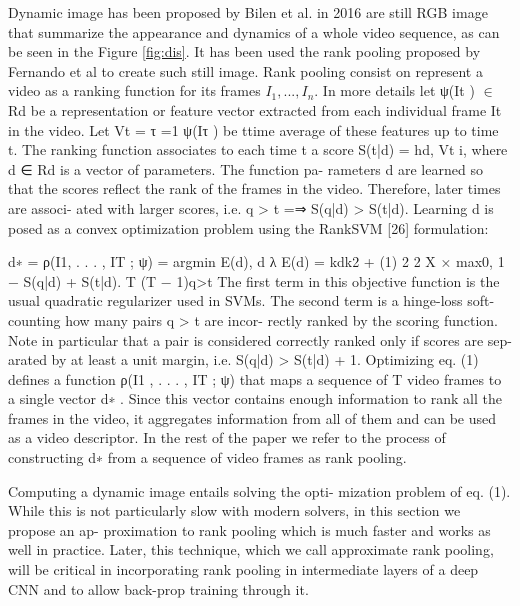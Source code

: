 \documentclass[10pt,twocolumn,letterpaper]{article}
\begin{document}
Dynamic image has been proposed by Bilen et al. in 2016 \cite{bilen2016dynamic} are still RGB image that summarize the appearance and dynamics of a whole video sequence, as can be seen in the Figure \ref{fig:dis}. It has been used the rank pooling proposed by Fernando et al \cite{FernandoGMGT15} to create such still image. Rank pooling consist on represent a video as a ranking function for its frames $I_1, ..., I_n$. In more details let ψ(It ) $\in$ Rd be a representation or feature vector extracted from each individual frame It in the video. Let Vt = τ =1 ψ(Iτ ) be
ttime average of these features up to time t. The ranking
function associates to each time t a score S(t|d) = hd, Vt i,
where d ∈ Rd is a vector of parameters. The function pa-
rameters d are learned so that the scores reflect the rank of
the frames in the video. Therefore, later times are associ-
ated with larger scores, i.e. q > t =⇒ S(q|d) > S(t|d).
Learning d is posed as a convex optimization problem using
the RankSVM [26] formulation:

d∗ = ρ(I1, . . . , IT ; ψ) = argmin E(d),
d
λ
E(d) = kdk2 +
 (1)
2
2
 X
×
 max{0, 1 − S(q|d) + S(t|d)}.
T (T − 1)q>t
The first term in this objective function is the usual
quadratic regularizer used in SVMs. The second term is
a hinge-loss soft-counting how many pairs q > t are incor-
rectly ranked by the scoring function. Note in particular that
a pair is considered correctly ranked only if scores are sep-
arated by at least a unit margin, i.e. S(q|d) > S(t|d) + 1.
Optimizing eq. (1) defines a function ρ(I1 , . . . , IT ; ψ)
that maps a sequence of T video frames to a single vector
d∗ . Since this vector contains enough information to rank
all the frames in the video, it aggregates information from
all of them and can be used as a video descriptor. In the rest
of the paper we refer to the process of constructing d∗ from
a sequence of video frames as rank pooling.

Computing a dynamic image entails solving the opti-
mization problem of eq. (1). While this is not particularly
slow with modern solvers, in this section we propose an ap-
proximation to rank pooling which is much faster and works
as well in practice. Later, this technique, which we call
approximate rank pooling, will be critical in incorporating
rank pooling in intermediate layers of a deep CNN and to
allow back-prop training through it.


\end{document}
